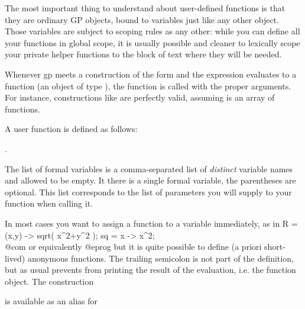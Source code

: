 The most important thing to understand about user-defined functions is
that they are ordinary GP objects, bound to variables just like any
other object. Those variables are subject to scoping rules as any other:
while you can define all your functions in global scope, it is usually
possible and cleaner to lexically scope your private helper functions to the
block of text where they will be needed.

Whenever gp meets a construction of the form 
and the expression  evaluates to a function (an object of type
), the function is called with the proper arguments. For
instance, constructions like  are perfectly valid,
assuming  is an array of functions.

\label{se:userfundef}
A user function is defined as follows:

  .

\noindent The list of formal variables is a comma-separated list of
\emph{distinct} variable names and allowed to be empty. It there is a single
formal variable, the parentheses are optional. This list corresponds to the
list of parameters you will supply to your function when calling it.

In most cases you want to assign a function to a variable immediately, as in
\bprog
R = (x,y) -> sqrt( x^2+y^2 );
sq = x -> x^2;  \\@com or equivalently 
@eprog\noindent
but it is quite possible to define (a priori short-lived) anonymous functions.
The trailing semicolon is not part of the definition, but as usual prevents
 from printing the result of the evaluation, i.e. the function
object. The construction


\noindent is available as an alias for


